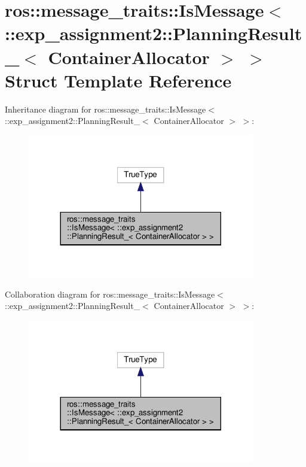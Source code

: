 \hypertarget{structros_1_1message__traits_1_1IsMessage_3_01_1_1exp__assignment2_1_1PlanningResult___3_01ContainerAllocator_01_4_01_4}{}\section{ros\+:\+:message\+\_\+traits\+:\+:Is\+Message$<$ \+:\+:exp\+\_\+assignment2\+:\+:Planning\+Result\+\_\+$<$ Container\+Allocator $>$ $>$ Struct Template Reference}
\label{structros_1_1message__traits_1_1IsMessage_3_01_1_1exp__assignment2_1_1PlanningResult___3_01ContainerAllocator_01_4_01_4}


Inheritance diagram for ros\+:\+:message\+\_\+traits\+:\+:Is\+Message$<$ \+:\+:exp\+\_\+assignment2\+:\+:Planning\+Result\+\_\+$<$ Container\+Allocator $>$ $>$\+:
\nopagebreak
\begin{figure}[H]
\begin{center}
\leavevmode
\includegraphics[width=281pt]{structros_1_1message__traits_1_1IsMessage_3_01_1_1exp__assignment2_1_1PlanningResult___3_01Conta012e73ac348755cbb9a075042216198a}
\end{center}
\end{figure}


Collaboration diagram for ros\+:\+:message\+\_\+traits\+:\+:Is\+Message$<$ \+:\+:exp\+\_\+assignment2\+:\+:Planning\+Result\+\_\+$<$ Container\+Allocator $>$ $>$\+:
\nopagebreak
\begin{figure}[H]
\begin{center}
\leavevmode
\includegraphics[width=281pt]{structros_1_1message__traits_1_1IsMessage_3_01_1_1exp__assignment2_1_1PlanningResult___3_01Contac2d55d1eca8180dc7d692b5c2fd91bd1}
\end{center}
\end{figure}


